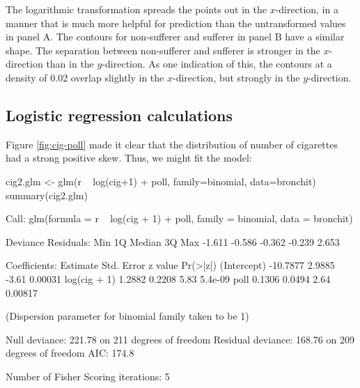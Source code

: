 The logarithmic transformation spreads the points out in the
$x$-direction, in a manner that is much more helpful for prediction
than the untransformed values in panel A.  The contours for
non-sufferer and sufferer in panel B have a similar shape.  The
separation between non-sufferer and sufferer is stronger in the
$x$-direction than in the $y$-direction.  As one indication of this,
the contours at a density of 0.02 overlap slightly in the $x$-direction,
but strongly in the $y$-direction.

\subsection*{Logistic regression calculations}

Figure \ref{fig:cig-poll} made it clear
that the distribution of number of cigarettes had a strong positive
skew.  Thus, we might fit the model:
\begin{fullwidth}
\begin{Schunk}
\begin{Sinput}
cig2.glm <- glm(r ~ log(cig+1) + poll, family=binomial, data=bronchit)
summary(cig2.glm)
\end{Sinput}
\begin{Soutput}

Call:
glm(formula = r ~ log(cig + 1) + poll, family = binomial, data = bronchit)

Deviance Residuals: 
   Min      1Q  Median      3Q     Max  
-1.611  -0.586  -0.362  -0.239   2.653  

Coefficients:
             Estimate Std. Error z value Pr(>|z|)
(Intercept)  -10.7877     2.9885   -3.61  0.00031
log(cig + 1)   1.2882     0.2208    5.83  5.4e-09
poll           0.1306     0.0494    2.64  0.00817

(Dispersion parameter for binomial family taken to be 1)

    Null deviance: 221.78  on 211  degrees of freedom
Residual deviance: 168.76  on 209  degrees of freedom
AIC: 174.8

Number of Fisher Scoring iterations: 5
\end{Soutput}
\end{Schunk}
\end{fullwidth}

